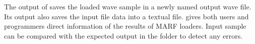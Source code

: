 The output of  saves the loaded wave sample in a newly named output wave file.
Its output also saves the input file data into a textual file.
 gives both users and programmers direct information of the results of MARF loaders.
Input sample can be compared with the expected output in the  folder to detect any errors.

